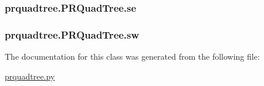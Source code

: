 \subsubsection[{se}]{\setlength{\rightskip}{0pt plus 5cm}prquadtree.\+P\+R\+Quad\+Tree.\+se}\label{classprquadtree_1_1PRQuadTree_acf5a1f668e9962b03120856564e0a3b0}
\hypertarget{classprquadtree_1_1PRQuadTree_aee59816ff69872d39d406a103dd2e2f8}{}
\subsubsection[{sw}]{\setlength{\rightskip}{0pt plus 5cm}prquadtree.\+P\+R\+Quad\+Tree.\+sw}\label{classprquadtree_1_1PRQuadTree_aee59816ff69872d39d406a103dd2e2f8}


The documentation for this class was generated from the following file\+:\begin{DoxyCompactItemize}
\item 
\hyperlink{prquadtree_8py}{prquadtree.\+py}\end{DoxyCompactItemize}
